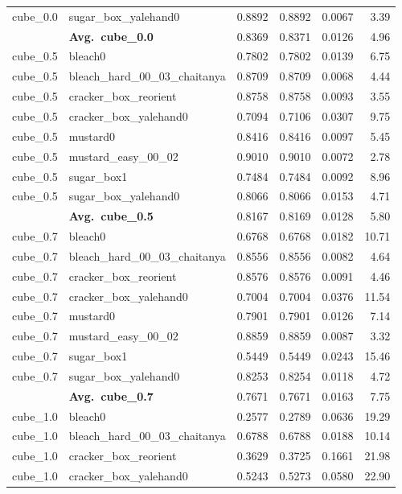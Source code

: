 \begin{longtable}{llrrrr}
  cube_0.0 & sugar\_box\_yalehand0 & 0.8892 & 0.8892 & 0.0067 & 3.39 \\
  \cmidrule{2-6}
  & \textbf{Avg.~cube_0.0} & 0.8369 & 0.8371 & 0.0126 & 4.96 \\
  \midrule
  cube_0.5 & bleach0 & 0.7802 & 0.7802 & 0.0139 & 6.75 \\
  cube_0.5 & bleach\_hard\_00\_03\_chaitanya & 0.8709 & 0.8709 & 0.0068 & 4.44 \\
  cube_0.5 & cracker\_box\_reorient & 0.8758 & 0.8758 & 0.0093 & 3.55 \\
  cube_0.5 & cracker\_box\_yalehand0 & 0.7094 & 0.7106 & 0.0307 & 9.75 \\
  cube_0.5 & mustard0 & 0.8416 & 0.8416 & 0.0097 & 5.45 \\
  cube_0.5 & mustard\_easy\_00\_02 & 0.9010 & 0.9010 & 0.0072 & 2.78 \\
  cube_0.5 & sugar\_box1 & 0.7484 & 0.7484 & 0.0092 & 8.96 \\
  cube_0.5 & sugar\_box\_yalehand0 & 0.8066 & 0.8066 & 0.0153 & 4.71 \\
  \cmidrule{2-6}
  & \textbf{Avg.~cube_0.5} & 0.8167 & 0.8169 & 0.0128 & 5.80 \\
  \midrule
  cube_0.7 & bleach0 & 0.6768 & 0.6768 & 0.0182 & 10.71 \\
  cube_0.7 & bleach\_hard\_00\_03\_chaitanya & 0.8556 & 0.8556 & 0.0082 & 4.64 \\
  cube_0.7 & cracker\_box\_reorient & 0.8576 & 0.8576 & 0.0091 & 4.46 \\
  cube_0.7 & cracker\_box\_yalehand0 & 0.7004 & 0.7004 & 0.0376 & 11.54 \\
  cube_0.7 & mustard0 & 0.7901 & 0.7901 & 0.0126 & 7.14 \\
  cube_0.7 & mustard\_easy\_00\_02 & 0.8859 & 0.8859 & 0.0087 & 3.32 \\
  cube_0.7 & sugar\_box1 & 0.5449 & 0.5449 & 0.0243 & 15.46 \\
  cube_0.7 & sugar\_box\_yalehand0 & 0.8253 & 0.8254 & 0.0118 & 4.72 \\
  \cmidrule{2-6}
  & \textbf{Avg.~cube_0.7} & 0.7671 & 0.7671 & 0.0163 & 7.75 \\
  \midrule
  cube_1.0 & bleach0 & 0.2577 & 0.2789 & 0.0636 & 19.29 \\
  cube_1.0 & bleach\_hard\_00\_03\_chaitanya & 0.6788 & 0.6788 & 0.0188 & 10.14 \\
  cube_1.0 & cracker\_box\_reorient & 0.3629 & 0.3725 & 0.1661 & 21.98 \\
  cube_1.0 & cracker\_box\_yalehand0 & 0.5243 & 0.5273 & 0.0580 & 22.90 \\

\end{longtable}

